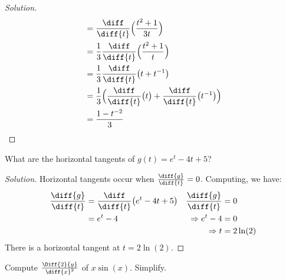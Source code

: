 \documentclass[crop=false,class=book,oneside]{standalone}
\begin{document}
\begin{proof}[Solution]
\begin{minipage}[b]{.49\textwidth}
\begin{align*}
                        &=\frac{\diff}{\diff{t}}
                            \Big(\frac{t^{2}+1}{3t}\Big)\\
                        &=\frac{1}{3}\frac{\diff}{\diff{t}}
                            \Big(\frac{t^{2}+1}{t}\Big)\\
                        &=\frac{1}{3}\frac{\diff}{\diff{t}}
                            \big(t+t^{-1}\big)\\
                        &=\frac{1}{3}\Big(\frac{\diff}{\diff{t}}
                            \big(t\big)
                        +\frac{\diff}{\diff{t}}
                            \big(t^{-1}\big)\Big)\\
                        &=\frac{1-t^{-2}}{3}
                    \end{align*}
                \end{minipage}
            \end{proof}
            \begin{problem}
                What are the horizontal tangents of
                $g(t)=e^{t}-4t+5$?
            \end{problem}
            \begin{proof}[Solution]
                Horizontal tangents occur when
                $\frac{\diff{g}}{\diff{t}}=0$.
                Computing, we have:
                \begin{align*}
                    \frac{\diff{g}}{\diff{t}}
                    &=\frac{\diff}{\diff{t}}
                        \big(e^{t}-4t+5\big)
                    &
                    \frac{\diff{g}}{\diff{t}}
                    &=0
                    \\
                    &=e^{t}-4
                    &
                    \Rightarrow
                    e^{t}-4&=0\\
                    &&
                    \Rightarrow
                    t&=2\ln(2)
                \end{align*}
                There is a horizontal tangent at $t=2\ln(2)$.
            \end{proof}
            \begin{problem}
                Compute $\frac{\Diff{2}{y}}{\diff{x}^{2}}$
                of $x\sin(x)$. Simplify.
            \end{problem}
\end{document}
